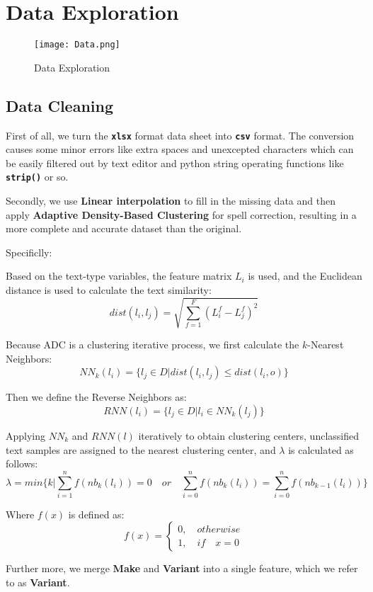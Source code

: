 \documentclass[12pt]{article}  %
\begin{document}
\section{Data Exploration}

\begin{figure}[htbp]
    \centering
    \texttt{[image: Data.png]}
    \caption{Data Exploration}\label{fig:Data}
\end{figure}

\subsection{Data Cleaning}
First of all, we turn the \textbf{\texttt{xlsx}} format data sheet into \textbf{\texttt{csv}} format. 
The conversion causes some minor errors like extra spaces and unexcepted characters which can be easily filtered out by text editor and python string operating functions like \textbf{\texttt{strip()}} or so.

Secondly, we use \textbf{Linear interpolation} to fill in the missing data and then apply \textbf{Adaptive Density-Based Clustering} for spell correction,
resulting in a more complete and accurate dataset than the original.

Specificlly:

Based on the text-type variables, the feature matrix $L_i$ is used, and the Euclidean distance is used to calculate the text similarity:
$$dist(l_i,l_j)=\sqrt{\sum_{f=1}^{F}(L_i^f-L_j^f)^2}$$

Because ADC is a clustering iterative process, we first calculate the $k$-Nearest Neighbors:
$$NN_k(l_i)=\{l_j \in D|dist(l_i,l_j)\leq dist(l_i,o)\}$$

Then we define the Reverse Neighbors as:
$$RNN(l_i)=\{l_j \in D|l_i\in NN_k(l_j)\}$$

Applying $NN_k$ and $RNN(l)$ iteratively to obtain clustering centers, unclassified text samples are assigned to the nearest clustering center, and $\lambda$ is calculated as follows:
$$\lambda=min\{k|\sum_{i=1}^{n}f(nb_k(l_i))=0\quad or\quad \sum_{i=0}^{n}f(nb_k(l_i))=\sum_{i=0}^{n}f(nb_{k-1}(l_i))\}$$

Where $f(x)$ is defined as:
$$f(x)=
\begin{cases}
0,\quad otherwise\\1,\quad if\quad x=0
\end{cases}$$

Further more, we merge \textbf{Make} and \textbf{Variant} into a single feature, which we refer to as \textbf{Variant}.
\end{document}
